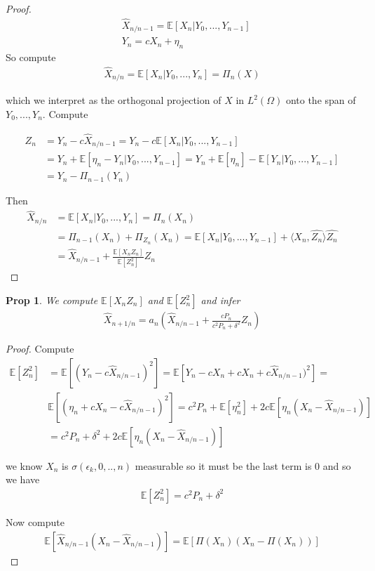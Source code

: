 \documentclass[11pt]{article}
\newcommand{\E}{\mathbb{E}}
\newtheorem{prop}{Prop}
\begin{document}
\begin{proof}

	\begin{align*}
		&\hat{X}_{n/n-1} = \E[X_n | Y_0,...,Y_{n-1}]\\
		&Y_n = cX_n + \eta_n
	\end{align*}
So compute
	\begin{align*}
		\hat{X}_{n/n} = \E[X_n | Y_0,...,Y_n] = \Pi_n (X)
	\end{align*}

	which we interpret as the orthogonal projection of $X$ in $L^2(\Omega)$ onto the span of $Y_0,...,Y_n$. 
	Compute

	\begin{align*}
		Z_n &= Y_n - c \hat{X}_{n/n-1} = Y_n - c \E[X_n | Y_0,...,Y_{n-1}] \\
		&= Y_n + \E[\eta_n - Y_n | Y_0,...,Y_{n-1}] =Y_n + \E[\eta_n]  - \E[Y_n | Y_0,...,Y_{n-1}]\\
		&= Y_n - \Pi_{n-1}(Y_n)
	\end{align*}

	Then 
	\begin{align*}
		\hat{X}_{n/n} &= \E[X_n | Y_0,...,Y_n] = \Pi_n(X_n) \\
		&= \Pi_{n-1}(X_n) + \Pi_{Z_n}(X_n) = \E[X_n | Y_0,...,Y_{n-1}] + \langle X_n,\hat{Z_n}\rangle \hat{Z_n} \\
		&= \hat{X}_{n/n-1} + \frac{\E[X_nZ_n]}{\E[Z_n^2]}Z_n
	\end{align*}
\end{proof}

\begin{prop}
	We compute $\E[X_n Z_n]$ and $\E[Z_n^2]$ and infer
	\begin{align*}
		\hat{X}_{n+1/n} = a_n(\hat{X}_{n/n-1} + \frac{cP_n}{c^2P_n + \delta^2}Z_n)
	\end{align*}
\end{prop}

\begin{proof}
	Compute 
	\begin{align*}
		\E[Z_n^2] &= \E[(Y_n - c\hat{X}_{n/n-1})^2] = \E[Y_n - cX_n + cX_n + c\hat{X}_{n/n-1})^2] = \\
		&\E[(\eta_n + cX_n - c\hat{X}_{n/n-1})^2] = c^2P_n + \E[\eta_n^2] + 2 c\E[\eta_n(X_n -\hat{X}_{n/n-1})] \\
		&= c^2P_n + \delta^2 + 2c\E[\eta_n(X_n - \hat{X}_{n/n-1})]
	\end{align*}

	we know $X_n$ is $\sigma(\epsilon_k,0,..,n)$ measurable so it must be the last term is 0 and so we have
	\begin{align*}
		\E[Z_n^2] = c^2P_n + \delta^2
	\end{align*}

	Now compute
	\begin{align*}
		\E[\hat{X}_{n/n-1}(X_n - \hat{X}_{n/n-1})] = \E[\Pi(X_n)(X_n - \Pi(X_n))]
	\end{align*}
\end{proof}
\end{document}
